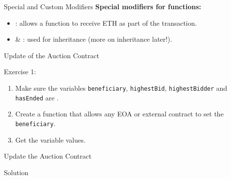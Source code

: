 \documentclass[handout]{beamer}
\begin{document}
\begin{frame}{Special and Custom Modifiers}
\textbf{Special modifiers for functions:}
	\begin{itemize}
		\item<1-> : allows a function to receive ETH as part of the transaction.
		\item<2->  \& : used for inheritance (\textcolor{focus}{more on inheritance later!}).
		\end{itemize}

\vspace{1em}
		
\vspace{1em}	
	
\end{frame}

\begin{frame}{Update of the Auction Contract}
	\begin{exercise}{Exercise 1:}
		\begin{enumerate}
			\item Make sure the variables \texttt{beneficiary}, \texttt{highestBid}, \texttt{highestBidder} and \texttt{hasEnded} are .
			\item Create a function that allows any EOA or external contract to set the \texttt{beneficiary}.
			\item Get the variable values.
		\end{enumerate}
	\end{exercise}
\end{frame}

\begin{frame}{Update the Auction Contract}
	\begin{samplecode}{Solution}
		
	\end{samplecode}
\end{frame}
\end{document}
